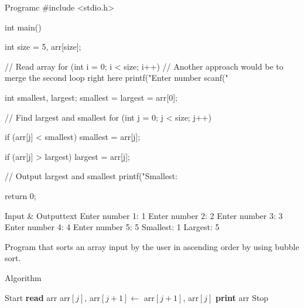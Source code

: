 \documentclass[11pt]{ipu-c}
\begin{document}
    \newpage
    \begin{code}
        {Program}{c}
#include <stdio.h>

int main() {
    int size = 5, arr[size];

    // Read array
    for (int i = 0; i < size; i++) {
        // Another approach would be to merge the second loop right here
        printf("Enter number %
        scanf("%
    }

    int smallest, largest;
    smallest = largest = arr[0];

    // Find largest and smallest
    for (int j = 0; j < size; j++) {
        if (arr[j] < smallest) {
            smallest = arr[j];
        }

        if (arr[j] > largest) {
            largest = arr[j];
        }
    }

    // Output largest and smallest
    printf("Smallest: %

    return 0;
}
    \end{code}
    \begin{code}
        {Input \& Output}{text}
Enter number 1: 1
Enter number 2: 2
Enter number 3: 3
Enter number 4: 4
Enter number 5: 5
Smallest: 1
Largest: 5
    \end{code}


    {Program that sorts an array input by the user in ascending order by using bubble sort.}

    \begin{tabularsection}{Algorithm}
        \begin{algorithmic}[1]
            \State Start
            \State \textbf{read} arr
                        \State arr$[j]$, arr$[j + 1] \gets$ arr$[j + 1]$, arr$[j]$
                    \EndIf
                \EndFor
            \EndFor
            \State \textbf{print} arr
            \State Stop
        \end{algorithmic}
    \end{tabularsection}
\end{document}
